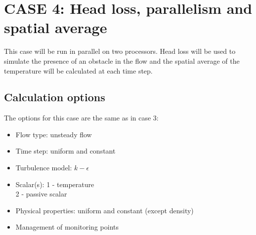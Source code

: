 %
%
%
%
%
%
%
\newpage
\section{CASE 4: Head loss, parallelism and spatial average}
\label{prg_case4}%
This case will be run in parallel on two processors. Head loss will be used to
simulate the presence of an obstacle in the flow and the spatial average of the
temperature will be calculated at each time step.

        \subsection{Calculation options}

The options for this case are the same as in case 3:
\begin{itemize}
\renewcommand{\labelitemi}{$\rightarrow$}
        \item Flow type: unsteady flow
        \item Time step: uniform and constant
        \item Turbulence model: $k-\epsilon$
        \item Scalar(s): 1 - temperature\\
      \hspace*{1.6cm} 2 - passive scalar
        \item Physical properties: uniform and constant (except density)
        \item Management of monitoring points
\end{itemize}


